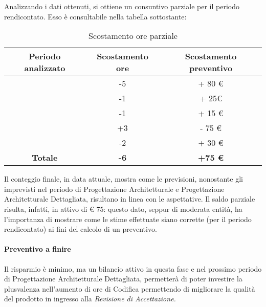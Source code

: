 Analizzando i dati ottenuti, si ottiene un consuntivo parziale per il periodo rendicontato. Esso è consultabile nella tabella sottostante:

\begin{table}[H]
	\begin{center}
		\begin{tabular}{|c|c|c|}
			\hline
			\textbf{Periodo analizzato}	& \textbf{Scostamento ore}	& \textbf{Scostamento preventivo} \\
			\hline
			\AdR	&	-5	&	+ 80 €	\\
			\hline
			\ARD	&	-1	&	+ 25€	\\
			\hline
			\PA   &		-1  &	+ 15 €	\\
			\hline
			\PD   &	+3  &	- 75 €	\\
			\hline
			\CO   &		-2  &	+ 30 €	\\
			\hline
			\textbf{Totale} & \textbf{-6} & \textbf{+75 €} \\
			\hline
		\end{tabular}
	\end{center}
	\caption{Scostamento ore parziale}
\end{table}

Il conteggio finale, in data attuale, mostra come le previsioni, nonostante gli imprevisti nel periodo di Progettazione Architetturale e Progettazione Architetturale Dettagliata, risultano in linea con le aspettative. Il saldo parziale risulta, infatti, in attivo di € 75: questo dato, seppur di moderata entità, ha l'importanza di mostrare come le stime effettuate siano corrette (per il periodo rendicontato) ai fini del calcolo di un preventivo.

\paragraph{Preventivo a finire}
Il risparmio è minimo, ma un bilancio attivo in questa fase e nel prossimo periodo di Progettazione Architetturale Dettagliata, permetterà di poter investire la plusvalenza nell'aumento di ore di Codifica permettendo di migliorare la qualità del prodotto in ingresso alla \textit{Revisione di Accettazione.}